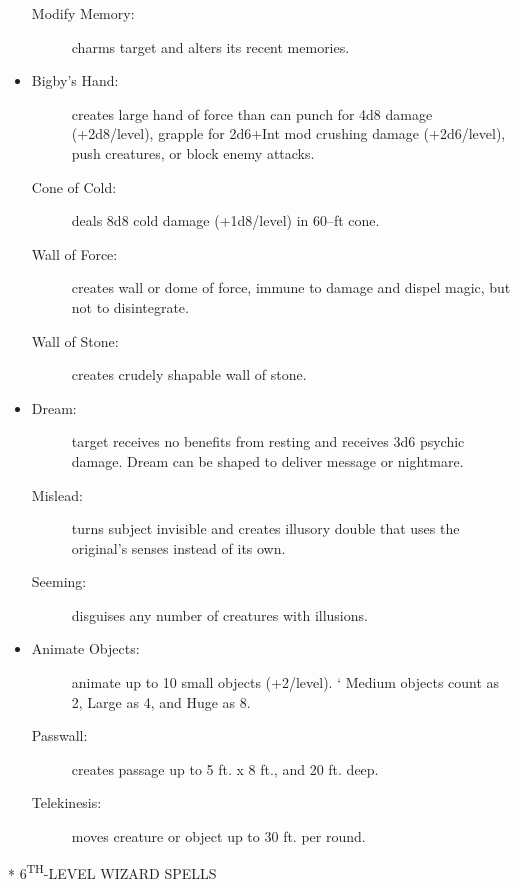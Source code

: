 \documentclass[DIV=14, paper=a4, fontsize=12pt, twocolumn, twoside]{scrartcl}
\makeatletter
\let\origsection\section
\renewcommand\section{\@ifstar{\starsection}{\nostarsection}}
\newcommand\nostarsection[1]
{\origsection{#1}\vspace{-0.5em}}
\newcommand\starsection[1]
{\vspace{-0.5cm}\origsection*{#1}\vspace{-0.3cm}}
\newcommand\invisiblesection[1]{%
  \refstepcounter{section}%
  \sectionmark{#1}
}
\newcommand\listsection[2]{%
	\invisiblesection{#2}
	\section*{\color{dndblue} #1}
}
\renewcommand\thesection{}
\makeatother
\begin{document}
\begin{itemize}[align=parleft,labelwidth=1cm]
\begin{description}
 \item[Modify Memory:] charms target and alters its recent memories.
\end{description}
\renewcommand{\labelitemi}{Evoc}\item
\begin{description}
 \item[Bigby’s Hand:] creates large hand of force than can punch for 4d8 damage (+2d8/level), grapple for 2d6+Int mod crushing damage (+2d6/level), push creatures, or block enemy attacks.
 \item[Cone of Cold:] deals 8d8 cold damage (+1d8/level) in 60–ft cone.
 \item[Wall of Force:] creates wall or dome of force, immune to damage and dispel magic, but not to disintegrate.
 \item[Wall of Stone:] creates crudely shapable wall of stone.
\end{description}
\renewcommand{\labelitemi}{Illus}\item
\begin{description}
 \item[Dream:] target receives no benefits from resting and receives 3d6 psychic damage. Dream can be shaped to deliver message or nightmare.
 \item[Mislead:] turns subject invisible and creates illusory double that uses the original’s senses instead of its own.
 \item[Seeming:] disguises any number of creatures with illusions.
\end{description}
\renewcommand{\labelitemi}{Trans}\item
\begin{description}
 \item[Animate Objects:] animate up to 10 small objects (+2/level). ‘ Medium objects count as 2, Large as 4, and Huge as 8.
 \item[Passwall:] creates passage up to 5 ft. x 8 ft., and 20 ft. deep.
 \item[Telekinesis:] moves creature or object up to 30 ft. per round.
\end{description}
\end{itemize}

\listsection{\color{dndblue}6\textsuperscript{TH}-LEVEL WIZARD SPELLS}{LEVEL 6}
\end{document}
